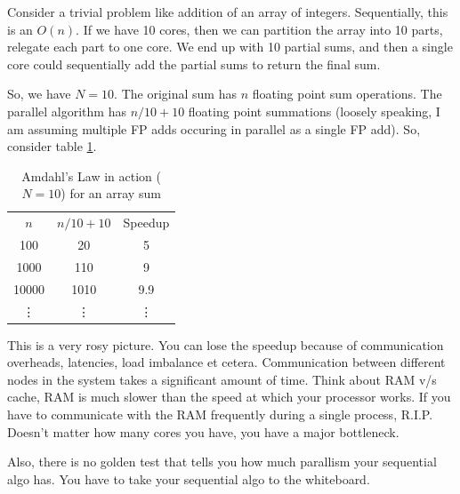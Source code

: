 \documentclass[a4paper]{article}
\begin{document}
Consider a trivial problem like addition of an array of integers.
Sequentially, this is an $O(n)$. If we have 10 cores, then we
can partition the array into 10 parts, relegate each part to one
core. We end up with 10 partial sums, and then a single core
could sequentially add the partial sums to return the final sum.

So, we have $N = 10$. The original sum has $n$ floating point sum
operations. The parallel algorithm has $n/10 + 10$ floating point
summations (loosely speaking, I am assuming multiple FP adds occuring
in parallel as a single FP add). So, consider table \ref{tab:tabam}.
\begin{table}[h]
	\centering
	\caption{Amdahl's Law in action ($N = 10$) for an array sum}
	\label{tab:tabam}
	\begin{tabular}{c c c}
		$n$ &   $n/10 + 10$ & Speedup\\
		100 & 20 & 5 \\
		1000 & 110 & 9 \\
		10000 & 1010 & 9.9 \\
		\vdots & \vdots & \vdots
	\end{tabular}
\end{table}

This is a very rosy picture. You can lose the speedup because of 
communication overheads, latencies, load imbalance et cetera. 
Communication between different nodes in the system takes a significant
amount of time. Think about RAM v/s cache, RAM is much slower than
the speed at which your processor works. If you have to communicate
with the RAM frequently during a single process, R.I.P. Doesn't
matter how many cores you have, you have a major bottleneck.

Also, there is no golden test that tells you how much parallism your
sequential algo has. You have to take your sequential algo to the
whiteboard.
\end{document}
